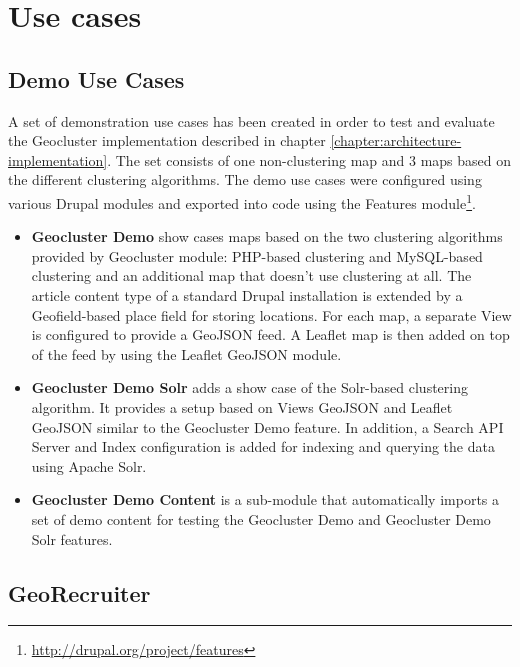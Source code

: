 
%
%

\chapter{Use cases}
\label{chapter:use-cases}

\section{Demo Use Cases}
\label{chapter:use-case-demo}

A set of demonstration use cases has been created in order to test and evaluate the Geocluster implementation described in chapter \ref{chapter:architecture-implementation}. The set consists of one non-clustering map and 3 maps based on the different clustering algorithms. The demo use cases were configured using various Drupal modules and exported into code using the Features module\footnote{\url{http://drupal.org/project/features}}.

\begin{itemize}

\item \textbf{Geocluster Demo} show cases maps based on the two clustering algorithms provided by Geocluster module: PHP-based clustering and MySQL-based clustering and an additional map that doesn't use clustering at all. The article content type of a standard Drupal installation is extended by a Geofield-based place field for storing locations. For each map, a separate View is configured to provide a GeoJSON feed. A Leaflet map is then added on top of the feed by using the Leaflet GeoJSON module.

\item \textbf{Geocluster Demo Solr} adds a show case of the Solr-based clustering algorithm. It provides a setup based on Views GeoJSON and Leaflet GeoJSON similar to the Geocluster Demo feature. In addition, a Search API Server and Index configuration is added for indexing and querying the data using Apache Solr.  

\item \textbf{Geocluster Demo Content} is a sub-module that automatically imports a set of demo content for testing the Geocluster Demo and Geocluster Demo Solr features.

\end{itemize}

\section{GeoRecruiter}
\label{chapter:use-case-georecruiter}


